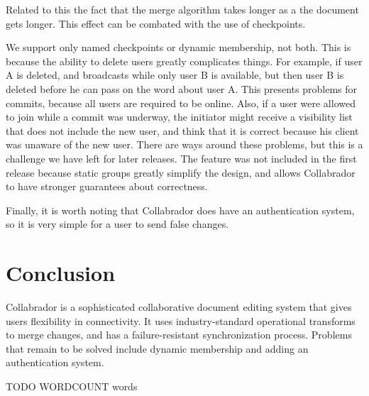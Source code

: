 \documentclass[11pt,titlepage]{article}
\begin{document}
Related to this the fact that the merge algorithm takes longer as a
the document gets longer. This effect can be combated with the use of
checkpoints.

We support only named checkpoints or dynamic membership, not
both. This is because the ability to delete users greatly complicates
things. For example, if user A is deleted, and broadcasts while only
user B is available, but then user B is deleted before he can pass on
the word about user A. This presents problems for commits, because all
users are required to be online.  Also, if a user were allowed to join
while a commit was underway, the initiator might receive a visibility
list that does not include the new user, and think that it is correct
because his client was unaware of the new user.  There are ways around
these problems, but this is a challenge we have left for later
releases. The feature was not included in the first release because
static groups greatly simplify the design, and allows Collabrador to
have stronger guarantees about correctness.

Finally, it is worth noting that Collabrador does have an
authentication system, so it is very simple for a user to send false
changes.

\section{Conclusion}

Collabrador is a sophisticated collaborative document editing system
that gives users flexibility in connectivity. It uses
industry-standard operational transforms to merge changes, and has a
failure-resistant synchronization process.  Problems that remain to be
solved include dynamic membership and adding an authentication system.

 

TODO WORDCOUNT words
\end{document}
